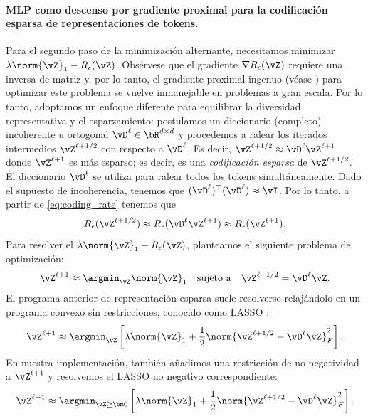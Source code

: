 \documentclass[../../book-main.tex]{subfiles}
\begin{document}
\paragraph{MLP como descenso por gradiente proximal para la codificación esparsa de
representaciones de tokens.} Para el segundo paso de la minimización
alternante, necesitamos minimizar $\lambda \norm{\vZ}_{1} -
R_{\epsilon}(\vZ)$. Obsérvese que el gradiente \(\nabla
R_{\epsilon}(\vZ)\) requiere una inversa de matriz y, por lo tanto, el
gradiente proximal ingenuo (véase ) para optimizar este problema
se vuelve inmanejable en problemas a gran escala. %
Por lo tanto, adoptamos un enfoque diferente para equilibrar
la diversidad representativa y el esparzamiento: postulamos un
diccionario (completo) incoherente u ortogonal $\vD^{\ell} \in \bR^{d
\times d}$ y procedemos a ralear los iterados intermedios $\vZ^{\ell
+ 1/2}$ con respecto a \(\vD^{\ell}\). Es decir, $\vZ^{\ell + 1/2}
\approx \vD^{\ell} \vZ^{\ell + 1}$ donde $\vZ^{\ell + 1}$ es más
esparso; es decir, es una \textit{codificación esparsa} de \(\vZ^{\ell +
1/2}\). El diccionario \(\vD^{\ell}\) se utiliza para ralear todos los tokens
simultáneamente.
Dado el supuesto de incoherencia, tenemos que $(\vD^{\ell})^\top(\vD^{\ell})
\approx \vI$. Por lo tanto, a partir de \eqref{eq:coding_rate} tenemos que
\begin{equation}
    R_{\epsilon}(\vZ^{\ell + 1/2}) \approx
    R_{\epsilon}(\vD^{\ell}\vZ^{\ell + 1}) \approx R_{\epsilon}(\vZ^{\ell + 1}).
\end{equation}
Para resolver el $\lambda \norm{\vZ}_{1} - R_{\epsilon}(\vZ)$, planteamos
el siguiente problema de optimización:
\begin{align*}
    \vZ^{\ell + 1} \approx \argmin_{\vZ}  \norm{\vZ}_1 \quad
    \mbox{sujeto a} \quad \vZ^{\ell + 1/2} = \vD^{\ell}\vZ.
\end{align*}
{El programa anterior de representación esparsa suele resolverse
    relajándolo en un programa convexo sin restricciones, conocido como LASSO
\citep{Wright-Ma-2022}:}
\begin{equation}
    \vZ^{\ell + 1} \approx \argmin_{\vZ} \left[\lambda \norm{\vZ}_1 +
    \frac{1}{2}\norm{\vZ^{\ell + 1/2} - \vD^{\ell} \vZ}_F^2 \right].
\end{equation}
En nuestra implementación, también añadimos una restricción de no negatividad a
$\vZ^{\ell + 1}$ y resolvemos el LASSO no negativo correspondiente:
\begin{equation}
    \vZ^{\ell + 1} \approx \argmin_{\vZ \geq \bm 0}
    \left[\lambda\norm{\vZ}_1 + \frac{1}{2}\norm{\vZ^{\ell + 1/2} -
    \vD^{\ell} \vZ}_{F}^{2}\right].
    \label{eq:sparse-nonnegative}
\end{equation}
\end{document}
